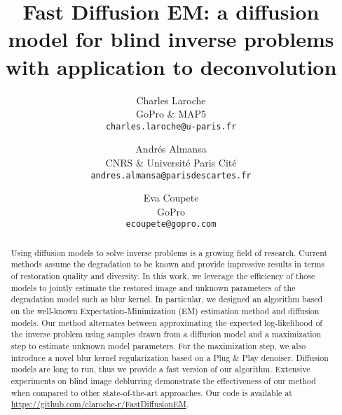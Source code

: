 \documentclass[10pt,twocolumn,letterpaper]{article}
\begin{document}
\title{Fast Diffusion EM: a diffusion model for blind inverse problems with application to deconvolution}

\author{Charles Laroche\\
GoPro \& MAP5 \\
{\tt\small charles.laroche@u-paris.fr}
\and
Andrés Almansa\\
CNRS \& Université Paris Cité\\
{\tt\small andres.almansa@parisdescartes.fr}
\and
Eva Coupete\\
GoPro\\
{\tt\small ecoupete@gopro.com}
}

\maketitle

\begin{abstract}
Using diffusion models to solve inverse problems is a growing field of research. Current methods assume the degradation to be known and provide impressive results in terms of restoration quality and diversity. In this work, we leverage the efficiency of those models to jointly estimate the restored image and unknown parameters of the degradation model such as blur kernel. In particular, we designed an algorithm based on the well-known Expectation-Minimization (EM) estimation method and diffusion models. Our method alternates between approximating the expected log-likelihood of the inverse problem using samples drawn from a diffusion model and a maximization step to estimate unknown model parameters. For the maximization step, we also introduce a novel blur kernel regularization based on a Plug \& Play denoiser. Diffusion models are long to run, thus we provide a fast version of our algorithm. Extensive experiments on blind image deblurring demonstrate the effectiveness of our method when compared to other state-of-the-art approaches.
Our code is available at \href{https://github.com/claroche-r/FastDiffusionEM}{https://github.com/claroche-r/FastDiffusionEM}.
\end{abstract}

\vspace{-0.5cm}
\end{document}
